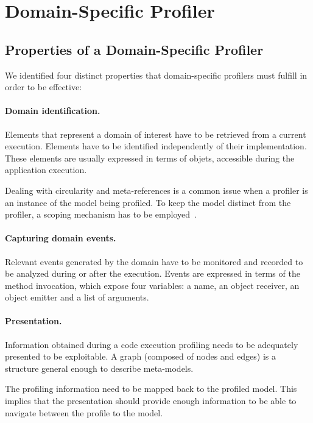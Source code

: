 \documentclass[runningheads]{llncs}
\newcommand{\seclabel}[1]{\label{sec:#1}}
\begin{document}

\section{Domain-Specific Profiler}\seclabel{profiler}

\subsection{Properties of a Domain-Specific Profiler}

We identified four distinct properties that domain-specific profilers must fulfill in order to be effective:


\paragraph{Domain identification.}
Elements that represent a domain of interest have to be retrieved from a current execution. Elements have to be identified independently of their implementation. These elements are usually expressed in terms of objets, accessible during the application execution. 

Dealing with circularity and meta-references is a common issue when a profiler is an instance of the model being profiled. To keep the model distinct from the profiler, a scoping mechanism has to be employed~\cite{Tant10a}.


\paragraph{Capturing domain events.} Relevant events generated by the domain have to be monitored and recorded to be analyzed during or after the execution. Events are expressed in terms of the method invocation, which expose four variables: a name, an object receiver, an object emitter and a list of arguments.


\paragraph{Presentation.} Information obtained during a code execution profiling needs to be adequately presented to be exploitable. A graph (composed of nodes and edges) is a structure general enough to describe meta-models.

The profiling information need to be mapped back to the profiled model. This implies that the presentation should provide enough information to be able to navigate between the profile to the model.
\end{document}
